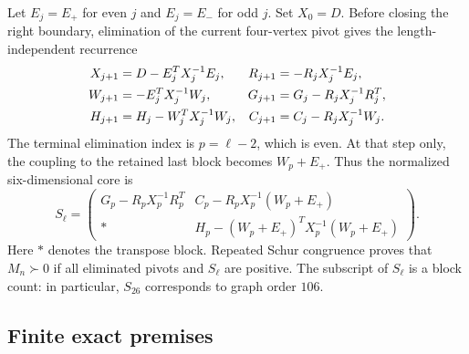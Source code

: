 Let $E_j=E_+$ for even $j$ and $E_j=E_-$ for odd $j$. Set $X_0=D$.
Before closing the right boundary, elimination of the current four-vertex
pivot gives the length-independent recurrence
\begin{align}
 X_{j+1}&=D-E_j^TX_j^{-1}E_j,&
 R_{j+1}&=-R_jX_j^{-1}E_j,\notag\\
 W_{j+1}&=-E_j^TX_j^{-1}W_j,&
 G_{j+1}&=G_j-R_jX_j^{-1}R_j^T,\label{eq:recurrence}\\
 H_{j+1}&=H_j-W_j^TX_j^{-1}W_j,&
 C_{j+1}&=C_j-R_jX_j^{-1}W_j.\notag
\end{align}
The terminal elimination index is $p=\ell-2$, which is even.
At that step only, the coupling to the retained last block becomes
$W_p+E_+$. Thus the normalized six-dimensional core is
\begin{equation}
 S_\ell=
 \begin{pmatrix}
 G_p-R_pX_p^{-1}R_p^T&C_p-R_pX_p^{-1}(W_p+E_+)\\
 *&H_p-(W_p+E_+)^TX_p^{-1}(W_p+E_+)
 \end{pmatrix}.
 \label{eq:core}
\end{equation}
Here $*$ denotes the transpose block. Repeated Schur congruence proves
that $M_n\succ0$ if all eliminated pivots and $S_\ell$ are positive.
The subscript of $S_\ell$ is a block count: in particular, $S_{26}$
corresponds to graph order $106$.

\subsection{Finite exact premises}

